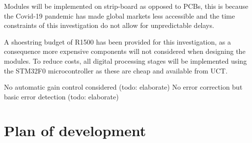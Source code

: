 Modules will be implemented on strip-board as opposed to PCBs, this is because the Covid-19 pandemic has made global markets less accessible and the time constraints of this investigation do not allow for unpredictable delays.

A shoestring budget of R1500 has been provided for this investigation, as a consequence more expensive components will not considered when designing the modules. To reduce costs, all digital processing stages will be implemented using the STM32F0 microcontroller as these are cheap and available from UCT.

No automatic gain control considered (todo: elaborate)
No error correction but basic error detection (todo: elaborate)





\section{Plan of development}

